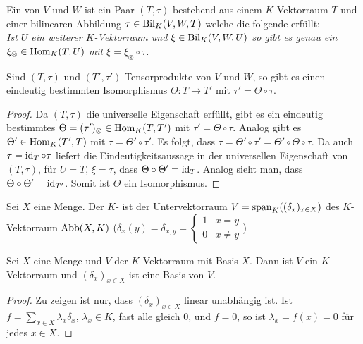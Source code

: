 \begin{definition}[Tensorprodukt]
	Ein  von $V$ und $W$ ist ein Paar $(T,\tau)$ bestehend aus einem $K$-Vektorraum $T$ und einer bilinearen Abbildung $\tau\in\operatorname{Bil}_K(V,W,T)$ welche die folgende  erfüllt: \\
	\textit{Ist $U$ ein weiterer $K$-Vektorraum und $\xi\in\operatorname{Bil}_K(V,W,U)$ so gibt es genau ein $\xi_\otimes\in\operatorname{Hom}_K(T,U)$ mit $\xi=\xi_\otimes\circ\tau$.}
\end{definition}

\begin{lemma}
	Sind $(T,\tau)$ und $(T',\tau')$ Tensorprodukte von $V$ und $W$, so gibt es einen eindeutig bestimmten Isomorphismus $\Theta:T\to T'$ mit $\tau'=\Theta\circ\tau$.
\end{lemma}
\begin{proof}
	Da $(T,\tau)$ die universelle Eigenschaft erfüllt, gibt es ein eindeutig bestimmtes $\Theta=(\tau')_\otimes\in\operatorname{Hom}_K(T,T')$ mit $\tau'=\Theta\circ\tau$. Analog gibt es $\Theta'\in\operatorname{Hom}_K(T',T)$ mit $\tau=\Theta'\circ\tau'$. Es folgt, dass $\tau=\Theta'\circ\tau'= \Theta'\circ\Theta\circ\tau$. Da auch $\tau=\operatorname{id}_T\circ\tau$ liefert die Eindeutigkeitsaussage in der universellen Eigenschaft von $(T,\tau)$, für $U=T$, $\xi=\tau$, dass $\Theta\circ\Theta'=\operatorname{id}_T$. Analog sieht man, dass $\Theta\circ\Theta'=\operatorname{id}_{T'}$. Somit ist $\Theta$ ein Isomorphismus.
\end{proof}

\begin{definition}
	Sei $X$ eine Menge. Der $K$- ist der Untervektorraum $V=\operatorname{span}_K((\delta_x)_{x\in X})$ des $K$-Vektorraum $\operatorname{Abb}(X,K)$ ($\delta_x(y)=\delta_{x,y}=\begin{cases}1&x=y\\0&x\neq y\end{cases}$)
\end{definition}

\begin{lemma}
	Sei $X$ eine Menge und $V$ der $K$-Vektorraum mit Basis $X$. Dann ist $V$ ein $K$-Vektorraum und $(\delta_x)_{x\in X}$ ist eine Basis von $V$.
\end{lemma}
\begin{proof}
	Zu zeigen ist nur, dass $(\delta_x)_{x\in X}$ linear unabhängig ist. Ist $f=\sum_{x\in X}\lambda_x \delta_x$, $\lambda_x\in K$, fast alle gleich 0, und $f=0$, so ist $\lambda_x=f(x)=0$ für jedes $x\in X$. 
\end{proof}

